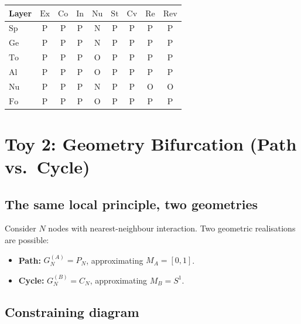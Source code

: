 \documentclass[11pt,a4paper]{article}
\theoremstyle{definition}
\theoremstyle{plain}
\newcommand{\Sp}{\mathrm{Sp}}
\newcommand{\Ge}{\mathrm{Ge}}
\newcommand{\To}{\mathrm{To}}
\newcommand{\Al}{\mathrm{Al}}
\newcommand{\Nu}{\mathrm{Nu}}
\newcommand{\Fo}{\mathrm{Fo}}
\newcommand{\Pmark}{\mathrm{P}}
\newcommand{\Nmark}{\mathrm{N}}
\newcommand{\Omark}{\mathrm{O}}
\begin{document}
\begin{center}
\begin{tabular}{l|cccccccc}
  \toprule
  Layer & $\mathrm{Ex}$ & $\mathrm{Co}$ & $\mathrm{In}$
  & $\mathrm{Nu}$ & $\mathrm{St}$ & $\mathrm{Cv}$
  & $\mathrm{Re}$ & $\mathrm{Rev}$ \\
  \midrule
  $\Sp$   & $\Pmark$ & $\Pmark$ & $\Pmark$ & $\Nmark$ & $\Pmark$ & $\Pmark$ & $\Pmark$ & $\Pmark$ \\
  $\Ge$   & $\Pmark$ & $\Pmark$ & $\Pmark$ & $\Nmark$ & $\Pmark$ & $\Pmark$ & $\Pmark$ & $\Pmark$ \\
  $\To$   & $\Pmark$ & $\Pmark$ & $\Pmark$ & $\Omark$ & $\Pmark$ & $\Pmark$ & $\Pmark$ & $\Pmark$ \\
  $\Al$   & $\Pmark$ & $\Pmark$ & $\Pmark$ & $\Omark$ & $\Pmark$ & $\Pmark$ & $\Pmark$ & $\Pmark$ \\
  $\Nu$   & $\Pmark$ & $\Pmark$ & $\Pmark$ & $\Nmark$ & $\Pmark$ & $\Pmark$ & $\Omark$ & $\Omark$ \\
  $\Fo$   & $\Pmark$ & $\Pmark$ & $\Pmark$ & $\Omark$ & $\Pmark$ & $\Pmark$ & $\Pmark$ & $\Pmark$ \\
  \bottomrule
\end{tabular}
\end{center}

\section{Toy 2: Geometry Bifurcation (Path vs.\ Cycle)}
\label{sec:toy2}

\subsection{The same local principle, two geometries}

Consider $N$ nodes with nearest-neighbour interaction. Two
geometric realisations are possible:
\begin{itemize}
  \item \textbf{Path:} $G_N^{(A)} = P_N$, approximating $M_A = [0,1]$.
  \item \textbf{Cycle:} $G_N^{(B)} = C_N$, approximating $M_B = S^1$.
\end{itemize}

\subsection{Constraining diagram}
\end{document}
